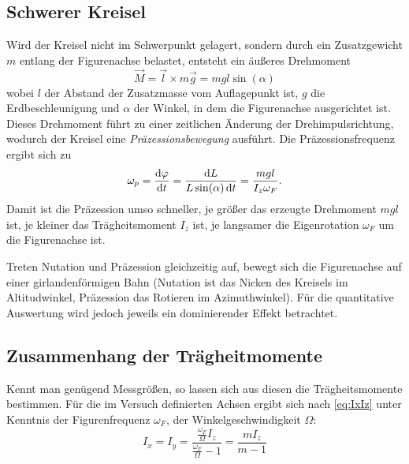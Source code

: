 \subsection{Schwerer Kreisel}\label{ssec:SchwerKrei}
Wird der Kreisel nicht im Schwerpunkt gelagert, sondern durch ein Zusatzgewicht \(m\) entlang der Figurenachse belastet, entsteht ein äußeres Drehmoment
\begin{equation}
    \label{eq:moment}
    \vec{M} = \vec{l} \times m\vec{g}=mgl\sin(\alpha)
\end{equation}
wobei \(l\) der Abstand der Zusatzmasse vom Auflagepunkt ist, \(g\) die Erdbeschleunigung und \(\alpha\) der Winkel, in dem die Figurenachse ausgerichtet ist.\\
Dieses Drehmoment führt zu einer zeitlichen Änderung der Drehimpulsrichtung, wodurch der Kreisel eine \textit{Präzessionsbewegung} ausführt. 
\FloatBarrier
Die Präzessionsfrequenz ergibt sich zu
\begin{equation}
    \label{eq:prezession}
    \omega_p = \frac{\mathop{}\!\mathrm{d} \varphi}{\mathop{}\!\mathrm{d} t}=\frac{\mathop{}\!\mathrm{d} L}{L \sin(\alpha)\mathop{}\!\mathrm{d} t}=\frac{mgl}{I_z \omega_F}.
\end{equation}
Damit ist die Präzession umso schneller, je größer das erzeugte Drehmoment \(mgl\) ist, je kleiner das Trägheitsmoment \(I_z\) ist, je langsamer die Eigenrotation \(\omega_F\) um die Figurenachse ist. \par
Treten Nutation und Präzession gleichzeitig auf, bewegt sich die Figurenachse auf einer girlandenförmigen Bahn (Nutation ist das Nicken des Kreisels im Altitudwinkel, Präzession das Rotieren im Azimuthwinkel). Für die quantitative Auswertung wird jedoch jeweils ein dominierender Effekt betrachtet.

\subsection{Zusammenhang der Trägheitmomente}\label{ssec:zumHangTraeg}
Kennt man genügend Messgrößen, so lassen sich aus diesen die Trägheitsmomente bestimmen. Für die im Versuch definierten Achsen ergibt sich nach \cref{eq:IxIz} unter Kenntnis der Figurenfrequenz \(\omega_F\), der Winkelgeschwindigkeit \(\Omega\):
\begin{equation}
    \label{eq:ix_formel}
    I_x = I_y = \frac{\frac{\omega_F}{\Omega}I_z}{\frac{\omega_F}{\Omega}-1}=\frac{m I_z}{m-1}
\end{equation}
\clearpage
